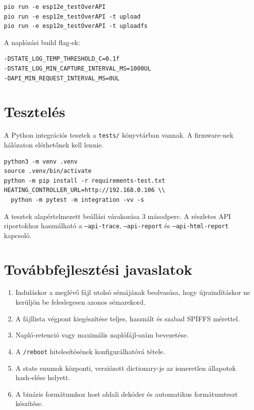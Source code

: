 \documentclass[11pt,a4paper]{article}
\begin{document}
\begin{lstlisting}
pio run -e esp12e_testOverAPI
pio run -e esp12e_testOverAPI -t upload
pio run -e esp12e_testOverAPI -t uploadfs
\end{lstlisting}

A naplózási build flag-ek:

\begin{lstlisting}
-DSTATE_LOG_TEMP_THRESHOLD_C=0.1f
-DSTATE_LOG_MIN_CAPTURE_INTERVAL_MS=1000UL
-DAPI_MIN_REQUEST_INTERVAL_MS=0UL
\end{lstlisting}

\section{Tesztelés}

A Python integrációs tesztek a \texttt{tests/} könyvtárban vannak. A firmware-nek hálózaton elérhetőnek kell lennie.

\begin{lstlisting}
python3 -m venv .venv
source .venv/bin/activate
python -m pip install -r requirements-test.txt
HEATING_CONTROLLER_URL=http://192.168.0.106 \\
  python -m pytest -m integration -vv -s
\end{lstlisting}

A tesztek alapértelmezett beállási várakozása 3 másodperc. A részletes API riportokhoz használható a \texttt{--api-trace}, \texttt{--api-report} és \texttt{--api-html-report} kapcsoló.

\section{Továbbfejlesztési javaslatok}

\begin{enumerate}
  \item Induláskor a meglévő fájl utolsó sémájának beolvasása, hogy újraindításkor ne kerüljön be feleslegesen azonos sémarekord.
  \item A fájllista végpont kiegészítése teljes, használt és szabad SPIFFS mérettel.
  \item Napló-retenció vagy maximális naplófájl-szám bevezetése.
  \item A \texttt{/reboot} hitelesítésének konfigurálhatóvá tétele.
  \item A state enumok központi, verziózott dictionary-je az ismeretlen állapotok hash-elése helyett.
  \item A bináris formátumhoz host oldali dekóder és automatikus formátumteszt készítése.
\end{enumerate}
\end{document}
